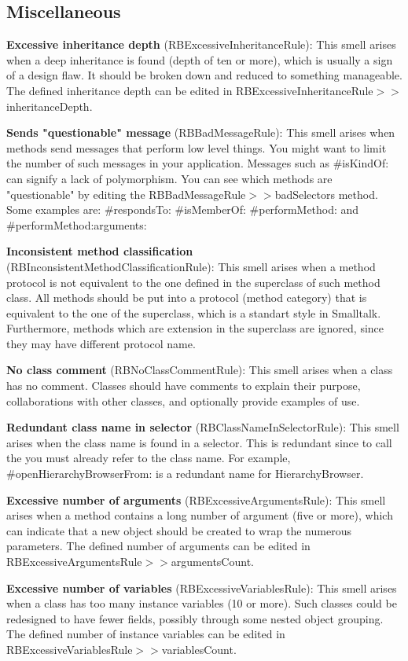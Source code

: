 \subsection{Miscellaneous}
\textbf{Excessive inheritance depth} (RBExcessiveInheritanceRule): This smell arises when a deep inheritance is found (depth of ten or more), which is usually a sign of a design flaw. It should be broken down and reduced to something manageable. The defined inheritance depth can be edited in RBExcessiveInheritanceRule$>>$inheritanceDepth.

\textbf{Sends "questionable" message} (RBBadMessageRule): This smell arises when methods send messages that perform low level things. You might want to limit the number of such messages in your application. Messages such as \#isKindOf: can signify a lack of polymorphism. You can see which methods are "questionable" by editing the RBBadMessageRule$>>$badSelectors method. Some examples are: \#respondsTo: \#isMemberOf: \#performMethod: and \#performMethod:arguments:

\textbf{Inconsistent method classification} (RBInconsistentMethodClassificationRule): This smell arises when a method protocol is not equivalent to the one defined in the superclass of such method class. All methods should be put into a protocol (method category) that is equivalent to the one of the superclass, which is a standart style in Smalltalk. Furthermore, methods which are extension in the superclass are ignored, since they may have different protocol name.

\textbf{No class comment} (RBNoClassCommentRule): This smell arises when a class has no comment. Classes should have comments to explain their purpose, collaborations with other classes, and optionally provide examples of use.

\textbf{Redundant class name in selector} (RBClassNameInSelectorRule): This smell arises when the class name is found in a selector. This is redundant since to call the you must already refer to the class name. For example, \#openHierarchyBrowserFrom: is a redundant name for HierarchyBrowser.

\textbf{Excessive number of arguments} (RBExcessiveArgumentsRule): This smell arises when a method contains a long number of argument (five or more), which can indicate that a new object should be created to wrap the numerous parameters. The defined number of arguments can be edited in RBExcessiveArgumentsRule$>>$argumentsCount.

\textbf{Excessive number of variables} (RBExcessiveVariablesRule): This smell arises when a class has too many instance variables (10 or more). Such classes could be redesigned to have fewer fields, possibly through some nested object grouping. The defined number of instance variables can be edited in RBExcessiveVariablesRule$>>$variablesCount.

